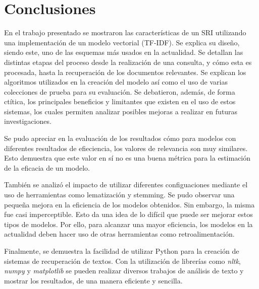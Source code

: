 \section{Conclusiones}\label{sec:conc}

En el trabajo presentado se mostraron las características de un SRI utilizando
una implementación de un modelo vectorial (TF-IDF). Se explica su diseño,
siendo este, uno de las esquemas más usados en la actualidad. Se detallan las
distintas etapas del proceso desde la realización de una consulta, y cómo esta
es procesada, hasta la recuperación de los documentos relevantes. Se explican
los algoritmos utilizados en la creación del modelo así como el uso de varias
colecciones de prueba para su evaluación. Se debatieron, además, de forma
ctítica, los principales beneficios y limitantes que existen en el uso de estos
sistemas, los cuales permiten analizar posibles mejoras a realizar en futuras
investigaciones.

Se pudo apreciar en la evaluación de los resultados cómo para modelos con
diferentes resultados de efieciencia, los valores de relevancia son muy similares.
Esto demuestra que este valor en sí no es una buena métrica para la estimación
de la eficacia de un modelo.

También se analizó el impacto de utilizar diferentes configuaciones mediante el uso
de herramientas como lematización y stemming. Se pudo observar una pequeña mejora
en la eficiencia de los modelos obtenidos. Sin embargo, la misma fue casi
imperceptible. Esto da una idea de lo difícil que puede ser mejorar estos tipos
de modelos. Por ello, para alcanzar una mayor eficiencia, los modelos en la 
actualidad deben hacer uso de otras herramientas como retroalimentación.

Finalmente, se demuestra la facilidad de utilizar Python para la creación de
sistemas de recuperación de textos. Con la utilización de librerías como
\emph{nltk}, \emph{numpy} y \emph{matplotlib} se pueden realizar diversos
trabajos de análisis de texto y mostrar los resultados, de una manera eficiente
y sencilla.
